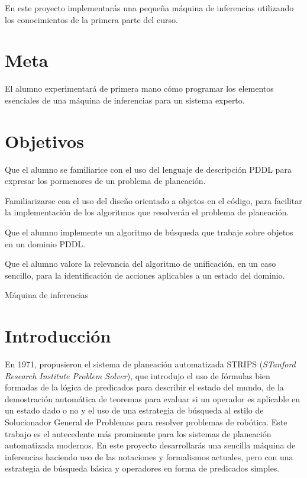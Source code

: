
En este proyecto implementarás una pequeña máquina de inferencias utilizando los conocimientos de la primera parte del curso.

\section{Meta}

El alumno experimentará de primera mano cómo programar los elementos esenciales de una máquina de inferencias para un sistema experto.

\section{Objetivos}

\begin{compactitem}
 \item Que el alumno se familiarice con el uso del lenguaje de descripción PDDL para expresar
       los pormenores de un problema de planeación.
 \item Familiarizarse con el uso del diseño orientado a objetos en el código, para facilitar
       la implementación de los algoritmos que resolverán el problema de planeación.
 \item Que el alumno implemente un algoritmo de búsqueda que trabaje sobre objetos en un
       dominio PDDL.
 \item Que el alumno valore la relevancia del algoritmo de unificación, en un caso sencillo,
       para la identificación de acciones aplicables a un estado del dominio.
\end{compactitem}


\begin{auxcode}
 \caption{Máquina de inferencias}
 \centering
\end{auxcode}


\section{Introducción}

En 1971, \cite{Fikes1971} propusieron el sistema de planeación automatizada STRIPS (\textit{STanford Research Institute Problem Solver}), que introdujo el uso de fórmulas bien formadas de la lógica de predicados para describir el estado del mundo, de la demostración automática de teoremas para evaluar si un operador es aplicable en un estado dado o no y el uso de una estrategia de búsqueda al estilo de Solucionador General de Problemas para resolver problemas de robótica.  Este trabajo es el antecedente más prominente para los sistemas de planeación automatizada modernos.  En este proyecto desarrollarás una sencilla máquina de inferencias haciendo uso de las notaciones y formalismos actuales, pero con una estrategia de búsqueda básica y operadores en forma de predicados simples.


